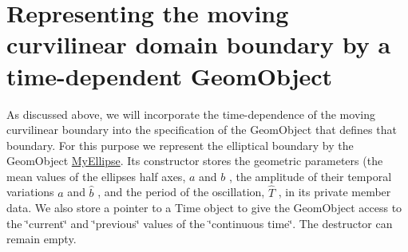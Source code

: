 \hypertarget{index_ellipse}{}\section{Representing the moving curvilinear domain boundary by a time-\/dependent Geom\+Object}\label{index_ellipse}
As discussed above, we will incorporate the time-\/dependence of the moving curvilinear boundary into the specification of the {\ttfamily Geom\+Object} that defines that boundary. For this purpose we represent the elliptical boundary by the {\ttfamily Geom\+Object} {\ttfamily \hyperlink{classMyEllipse}{My\+Ellipse}}. Its constructor stores the geometric parameters (the mean values of the ellipse\textquotesingle{}s half axes, $ a $ and $ b $ , the amplitude of their temporal variations $ \hat{a} $ and $ \hat{b} $ , and the period of the oscillation, $ \hat{T} $ , in its private member data. We also store a pointer to a {\ttfamily Time} object to give the {\ttfamily Geom\+Object} access to the \char`\"{}current\char`\"{} and \char`\"{}previous\char`\"{} values of the \char`\"{}continuous time\char`\"{}. The destructor can remain empty.

